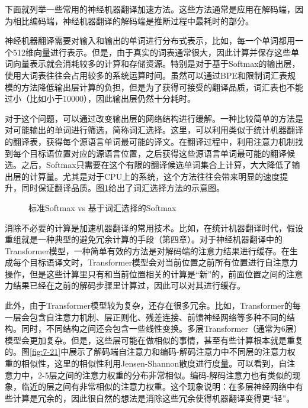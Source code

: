 \parinterval 下面就列举一些常用的神经机器翻译加速方法。这些方法通常是应用在解码端，因为相比编码端，神经机器翻译的解码端是推断过程中最耗时的部分。

\vspace{0.5em}
\vspace{0.5em}

\parinterval 神经机器翻译需要对输入和输出的单词进行分布式表示，比如，每一个单词都用一个512维向量进行表示。但是，由于真实的词表通常很大，因此计算并保存这些单词向量表示就会消耗较多的计算和存储资源。特别是对于基于Softmax的输出层，使用大词表往往会占用较多的系统运算时间。虽然可以通过BPE和限制词汇表规模的方法降低输出层计算的负担，但是为了获得可接受的翻译品质，词汇表也不能过小（比如小于10000），因此输出层仍然十分耗时。

\parinterval 对于这个问题，可以通过改变输出层的网络结构进行缓解\cite{DBLP:conf/acl/JeanCMB15}。一种比较简单的方法是对可能输出的单词进行筛选，简称词汇选择。这里，可以利用类似于统计机器翻译的翻译表，获得每个源语言单词最可能的译文。在翻译过程中，利用注意力机制找到每个目标语位置对应的源语言位置，之后获得这些源语言单词最可能的翻译候选。之后，Softmax只需要在这个有限的翻译候选单词集合上计算，大大降低了输出层的计算量。尤其是对于CPU上的系统，这个方法往往会带来明显的速度提升，同时保证翻译品质。图\ref{fig:7-20}给出了词汇选择方法的示意图。

\begin{figure}[htp]
\centering

\caption{标准Softmax vs 基于词汇选择的Softmax}
\label{fig:7-20}
\end{figure}

\vspace{0.5em}
\vspace{0.5em}

\parinterval 消除不必要的计算是加速机器翻译的常用技术。比如，在统计机器翻译时代，假设重组就是一种典型的避免冗余计算的手段（第四章）。对于神经机器翻译中的Transformer模型，一种简单有效的方法是对解码端的注意力结果进行缓存。在生成每个目标语译文时，Transformer模型会对当前位置之前所有位置进行自注意力操作，但是这些计算里只有和当前位置相关的计算是``新''的，前面位置之间的注意力结果已经在之前的解码步骤里计算过，因此可以对其进行缓存。

\parinterval 此外，由于Transformer模型较为复杂，还存在很多冗余。比如，Transformer的每一层会包含自注意力机制、层正则化、残差连接、前馈神经网络等多种不同的结构。同时，不同结构之间还会包含一些线性变换。多层Transformer（通常为6层）模型会更加复杂。但是，这些层可能在做相似的事情，甚至有些计算根本就是重复的。图\ref{fig:7-21}中展示了解码端自注意力和编码-解码注意力中不同层的注意力权重的相似性，这里的相似性利用Jensen-Shannon散度进行度量\cite{61115}。可以看到，自注意力中，2-5层之间的注意力权重的分布非常相似。编码-解码注意力也有类似的现象，临近的层之间有非常相似的注意力权重。这个现象说明：在多层神经网络中有些计算是冗余的，因此很自然的想法是消除这些冗余使得机器翻译变得更``轻''。


